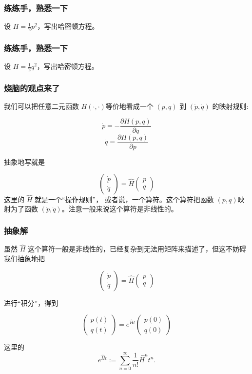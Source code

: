 \documentclass[CJK]{beamer}
\begin{document}
\begin{frame}
  \frametitle{练练手，熟悉一下}

  
  设 $H = \frac{1}{2}p^2$，写出哈密顿方程。

\end{frame}


\begin{frame}
  \frametitle{练练手，熟悉一下}

  
  设 $H = \frac{1}{2}q^2$，写出哈密顿方程。

\end{frame}

\begin{frame}
  \frametitle{ 烧脑的观点来了}
  我们可以把任意二元函数 $H(\cdot, \cdot)$等价地看成一个 $(p, q)$ 到 $(\dot p, \dot q)$ 的映射规则:
  
  $$\dot p = -\frac{\partial H(p,q)}{\partial q}$$
  $$\dot q = \frac{\partial H(p,q)}{\partial p}$$

  抽象地写就是

  $$\begin{pmatrix}
    \dot p \\
    \dot q
  \end{pmatrix}
  = \hat{H} \begin{pmatrix}
     p \\
     q
  \end{pmatrix}
  $$
  这里的 $\hat{H}$ 就是一个“操作规则”， 或者说，一个算符。这个算符把函数 $(p, q)$映射为了函数 $(\dot p, \dot q)$。注意一般来说这个算符是非线性的。
  
\end{frame}

\begin{frame}
  \frametitle{抽象解}
  虽然 $\hat{H}$ 这个算符一般是非线性的，已经复杂到无法用矩阵来描述了，但这不妨碍我们抽象地把

  $$\begin{pmatrix}
    \dot p \\
    \dot q
  \end{pmatrix}
  = \hat{H} \begin{pmatrix}
     p \\
     q
  \end{pmatrix}  $$
  
  进行“积分”，得到
  
  $$\begin{pmatrix}
    p(t) \\
    q(t)
  \end{pmatrix}
  = e^{\hat{H}t} \begin{pmatrix}
     p(0) \\
     q(0)
  \end{pmatrix}  $$

  这里的
  $$e^{\hat{H}t}:=\sum_{n=0}^\infty \frac{1}{n!}\hat{H}^nt^n.$$  
\end{frame}
\end{document}
